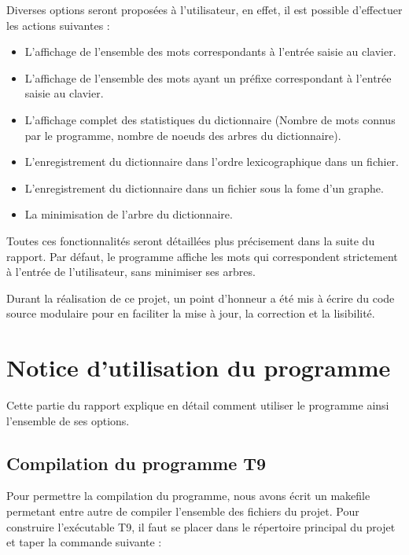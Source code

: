 \documentclass[15pt, a4paper]{article}
\begin{document}
\bigskip

Diverses options seront proposées à l'utilisateur, en effet, il est possible d'effectuer 
les actions suivantes :

\bigskip

\begin{itemize}
\item L'affichage de l'ensemble des mots correspondants à l'entrée saisie au clavier.
\item L'affichage de l'ensemble des mots ayant un préfixe correspondant à l'entrée saisie au clavier.
\item L'affichage complet des statistiques du dictionnaire (Nombre de mots connus par le programme,
  nombre de noeuds des arbres du dictionnaire).
\item L'enregistrement du dictionnaire dans l'ordre lexicographique dans un fichier.
\item L'enregistrement du dictionnaire dans un fichier sous la fome d'un graphe.
\item La minimisation de l'arbre du dictionnaire.
\end{itemize}

\bigskip

\noindent Toutes ces fonctionnalités seront détaillées plus précisement dans la suite du rapport.
Par défaut, le programme affiche les mots qui correspondent strictement à l'entrée de l'utilisateur, sans
minimiser ses arbres.

\bigskip

Durant la réalisation de ce projet, un point d'honneur a été mis à écrire du code source modulaire pour en
faciliter la mise à jour, la correction et la lisibilité.

\section{Notice d'utilisation du programme}

\noindent Cette partie du rapport explique en détail comment utiliser le programme ainsi l'ensemble de ses 
options.

\subsection{Compilation du programme T9}
Pour permettre la compilation du programme, nous avons écrit un makefile permetant entre autre de compiler 
l'ensemble des fichiers du projet. Pour construire l'exécutable T9, il faut se placer dans le répertoire 
principal du projet et taper la commande suivante :
\end{document}
